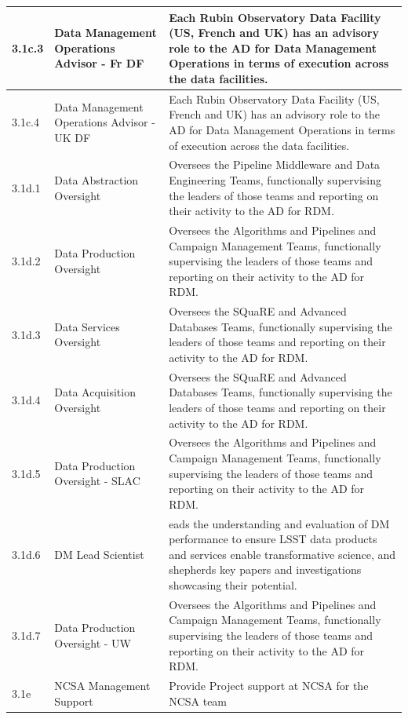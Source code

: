 \begin{longtable} {|p{}|p{}|p{}|}
{3.1c.3}&{Data Management Operations Advisor - Fr DF}&{Each Rubin Observatory Data Facility (US, French and UK) has an advisory role to the AD for Data Management Operations in terms of execution across the data facilities.  } \\ \hline
{3.1c.4}&{Data Management Operations Advisor - UK DF}&{Each Rubin Observatory Data Facility (US, French and UK) has an advisory role to the AD for Data Management Operations in terms of execution across the data facilities.  } \\ \hline
{3.1d.1}&{Data Abstraction Oversight}&{Oversees the Pipeline Middleware and Data Engineering Teams, functionally supervising the leaders of those teams and reporting on their activity to the AD for RDM. } \\ \hline
{3.1d.2}&{Data Production Oversight}&{Oversees the Algorithms and Pipelines and Campaign Management Teams, functionally supervising the leaders of those teams and reporting on their activity to the AD for RDM. } \\ \hline
{3.1d.3}&{Data Services Oversight}&{Oversees the SQuaRE and Advanced Databases Teams, functionally supervising the leaders of those teams and reporting on their activity to the AD for RDM. } \\ \hline
{3.1d.4}&{Data Acquisition Oversight}&{Oversees the SQuaRE and Advanced Databases Teams, functionally supervising the leaders of those teams and reporting on their activity to the AD for RDM. } \\ \hline
{3.1d.5}&{Data Production Oversight - SLAC}&{Oversees the Algorithms and Pipelines and Campaign Management Teams, functionally supervising the leaders of those teams and reporting on their activity to the AD for RDM. } \\ \hline
{3.1d.6}&{DM Lead Scientist}&{eads the understanding and evaluation of DM performance to ensure LSST data products and services enable transformative science, and shepherds key papers and investigations showcasing their potential.} \\ \hline
{3.1d.7}&{Data Production Oversight - UW}&{Oversees the Algorithms and Pipelines and Campaign Management Teams, functionally supervising the leaders of those teams and reporting on their activity to the AD for RDM. } \\ \hline
{3.1e}&{NCSA Management Support}&{Provide Project support at NCSA for the NCSA team} \\ \hline
\end{longtable} \normalsize
